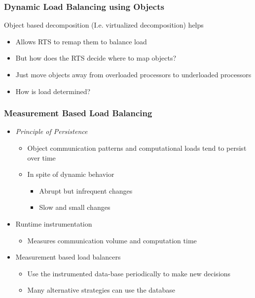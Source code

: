 \begin{frame}[fragile]
\frametitle{Dynamic Load Balancing using Objects}

Object based decomposition (I.e. virtualized decomposition) helps
\begin{itemize}
 \item Allows RTS to remap them to balance load
 \item But how does the RTS decide where to map objects?
 \item Just move objects away from overloaded processors to underloaded processors
 \item How is load determined?
\end{itemize}
\end{frame}

\begin{frame}[fragile]
\frametitle{Measurement Based Load Balancing}
\begin{itemize}
 \item \emph{Principle of Persistence}
 \begin{itemize}
  \item Object communication patterns and computational loads tend to persist over time
  \item In spite of dynamic behavior
  \begin{itemize}
   \item Abrupt but infrequent changes
   \item Slow and small changes
  \end{itemize}
 \end{itemize}
\item Runtime instrumentation
\begin{itemize}
 \item Measures communication volume and computation time
\end{itemize}
\item Measurement based load balancers
\begin{itemize}
 \item Use the instrumented data-base periodically to make new decisions
 \item Many alternative strategies can use the database
\end{itemize}
\end{itemize}
\end{frame}

